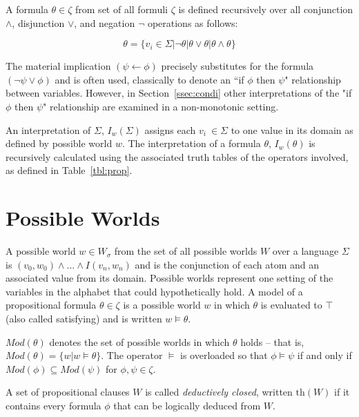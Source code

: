 A formula $\theta \in \zeta$ from set of all formuli $\zeta$ is defined recursively over all conjunction $\land$, disjunction $\lor$, and negation $\lnot$ operations as follows:

\[
\theta = \{ v_i \in \Sigma | \lnot \theta | \theta \lor \theta | \theta \land \theta \}
\]


The material implication $(\psi \leftarrow \phi)$ precisely substitutes for the formula $(\lnot \psi \lor \phi)$ and is often used, classically to denote an ``if $\phi$ then $\psi$" relationship between variables. However, in Section~\ref{ssec:condi} other interpretations of the "if $\phi$ then $\psi$" relationship are examined in a non-monotonic setting.

An interpretation of $\Sigma$, $I_w(\Sigma)$ assigns each $v_i\ \in \Sigma$ to one value in its domain as defined by possible world $w$. The interpretation of a formula $\theta$, $I_w(\theta)$ is recursively calculated using the associated truth tables of the operators involved, as defined in Table~\ref{tbl:prop}. 

\section{Possible Worlds}
A possible world $w\in W_\sigma$ from the set of all possible worlds $W$ over a language $\Sigma$ is $(v_0,w_0) \land ... \land I(v_n,w_n)$ and is the conjunction of each atom and an associated value from its domain. Possible worlds represent one setting of the variables in the alphabet that could hypothetically hold. A model of a propositional formula $\theta \in \zeta$ is a possible world $w$ in which $\theta$ is evaluated to $\top$ (also called satisfying) and is written $w \models \theta$. 

$Mod(\theta)$ denotes the set of possible worlds in which $\theta$ holds -- that is, $Mod(\theta)=\{w|w\models \theta\}$. The operator $\models$ is overloaded so that $\phi \models \psi$ if and only if $Mod(\phi) \subseteq Mod(\psi)$ for $\phi,\psi \in \zeta$.

A set of propositional clauses $W$ is called \textit{deductively closed}, written $\text{th}(W)$ if it contains every formula $\phi$ that can be logically deduced from $W$. 

